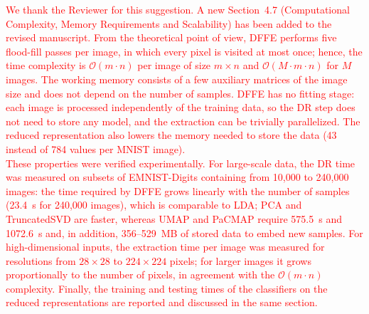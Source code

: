 \documentclass{ar2rc}
\begin{document}
\AR
\textcolor{red}{We thank the Reviewer for this suggestion. A new Section~4.7 (Computational Complexity, Memory Requirements and Scalability) has been added to the revised manuscript. From the theoretical point of view, DFFE performs five flood-fill passes per image, in which every pixel is visited at most once; hence, the time complexity is $\mathcal{O}(m \cdot n)$ per image of size $m \times n$ and $\mathcal{O}(M \cdot m \cdot n)$ for $M$ images. The working memory consists of a few auxiliary matrices of the image size and does not depend on the number of samples. DFFE has no fitting stage: each image is processed independently of the training data, so the DR step does not need to store any model, and the extraction can be trivially parallelized. The reduced representation also lowers the memory needed to store the data (43 instead of 784 values per MNIST image). \\
These properties were verified experimentally. For large-scale data, the DR time was measured on subsets of EMNIST-Digits containing from 10{,}000 to 240{,}000 images: the time required by DFFE grows linearly with the number of samples (23.4~s for 240{,}000 images), which is comparable to LDA; PCA and TruncatedSVD are faster, whereas UMAP and PaCMAP require 575.5~s and 1072.6~s and, in addition, 356--529~MB of stored data to embed new samples. For high-dimensional inputs, the extraction time per image was measured for resolutions from $28\times28$ to $224\times224$ pixels; for larger images it grows proportionally to the number of pixels, in agreement with the $\mathcal{O}(m \cdot n)$ complexity. Finally, the training and testing times of the classifiers on the reduced representations are reported and discussed in the same section.}
\end{document}
